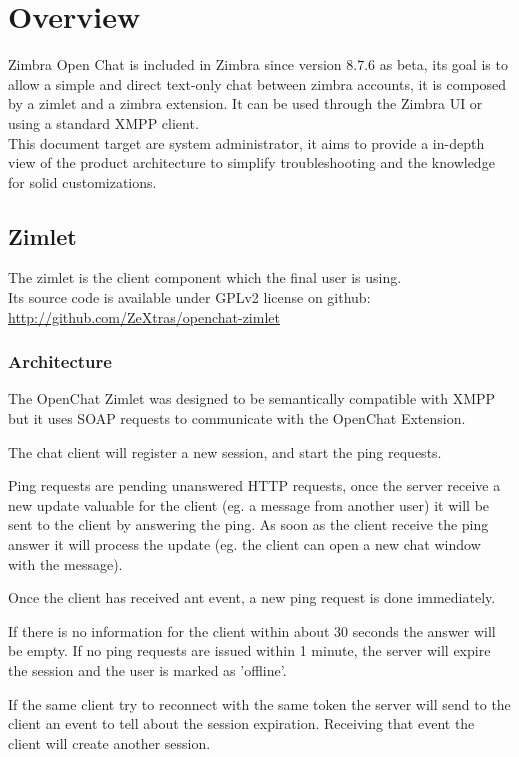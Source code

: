 \chapter{Overview}

Zimbra Open Chat is included in Zimbra since version 8.7.6 as beta, its goal is to allow a simple and direct text-only chat
between zimbra accounts, it is composed by a zimlet and a zimbra extension.
It can be used through the Zimbra UI or using a standard XMPP client.\\

This document target are system administrator, it aims to provide a in-depth view of the product architecture to
simplify troubleshooting and the knowledge for solid customizations.

\section{Zimlet}
The zimlet is the client component which the final user is using.\\
Its source code is available under GPLv2 license on github: \url{http://github.com/ZeXtras/openchat-zimlet}

\ifdefined\INTERNALDOC %
\subsection{Architecture}
The OpenChat Zimlet was designed to be semantically compatible with XMPP but it uses SOAP requests to communicate with
 the OpenChat Extension.

The chat client will register a new session, and start the ping requests.

Ping requests are pending unanswered HTTP requests, once the server receive a new update valuable for the client (eg.
 a message from another user) it will be sent to the client by answering the ping. As soon as the client receive
 the ping answer it will process the update (eg. the client can open a new chat window with the message).

Once the client has received ant event, a new ping request is done immediately.

If there is no information for the client within  about 30 seconds the answer will be empty. If no ping requests are issued
 within 1 minute, the server will expire the session and the user is marked as 'offline'.

If the same client try to reconnect with the same token the server will send to the client an event to tell about the session
 expiration. Receiving that event the client will create another session.

